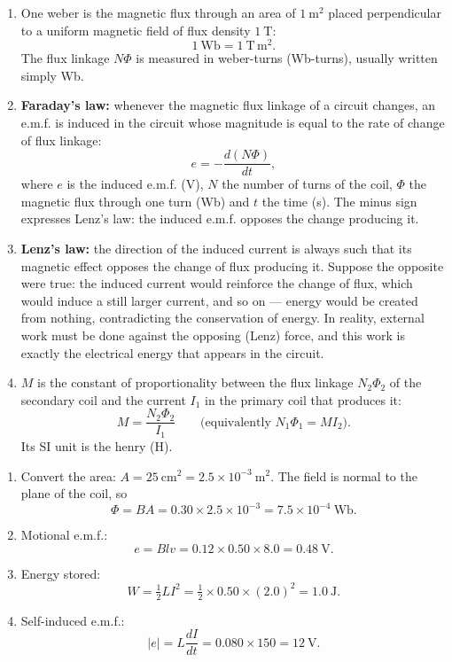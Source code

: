 \documentclass[11pt]{article}
\begin{document}
\begin{corrige}
\begin{enumerate}
\item One weber is the magnetic flux through an area of $1\ \mathrm{m^2}$ placed perpendicular to a uniform magnetic field of flux density $1\ \mathrm{T}$:
\[ 1\ \mathrm{Wb} = 1\ \mathrm{T\,m^2}. \]
The flux linkage $N\Phi$ is measured in weber-turns (Wb-turns), usually written simply Wb.
\item \textbf{Faraday's law:} whenever the magnetic flux linkage of a circuit changes, an e.m.f. is induced in the circuit whose magnitude is equal to the rate of change of flux linkage:
\[ e = -\frac{d(N\Phi)}{dt}, \]
where $e$ is the induced e.m.f. (V), $N$ the number of turns of the coil, $\Phi$ the magnetic flux through one turn (Wb) and $t$ the time (s). The minus sign expresses Lenz's law: the induced e.m.f. opposes the change producing it.
\item \textbf{Lenz's law:} the direction of the induced current is always such that its magnetic effect opposes the change of flux producing it. Suppose the opposite were true: the induced current would reinforce the change of flux, which would induce a still larger current, and so on --- energy would be created from nothing, contradicting the conservation of energy. In reality, external work must be done against the opposing (Lenz) force, and this work is exactly the electrical energy that appears in the circuit.
\item $M$ is the constant of proportionality between the flux linkage $N_2\Phi_2$ of the secondary coil and the current $I_1$ in the primary coil that produces it:
\[ M = \frac{N_2\Phi_2}{I_1} \qquad \text{(equivalently } N_1\Phi_1 = MI_2\text{)}. \]
Its SI unit is the henry (H).
\end{enumerate}
\end{corrige}

\begin{corrige}
\begin{enumerate}
\item Convert the area: $A = 25\ \mathrm{cm^2} = 2.5\times10^{-3}\ \mathrm{m^2}$. The field is normal to the plane of the coil, so
\[ \Phi = BA = 0.30 \times 2.5\times10^{-3} = 7.5\times10^{-4}\ \mathrm{Wb}. \]
\item Motional e.m.f.:
\[ e = Blv = 0.12 \times 0.50 \times 8.0 = 0.48\ \mathrm{V}. \]
\item Energy stored:
\[ W = \tfrac{1}{2}LI^2 = \tfrac{1}{2}\times 0.50 \times (2.0)^2 = 1.0\ \mathrm{J}. \]
\item Self-induced e.m.f.:
\[ |e| = L\frac{dI}{dt} = 0.080 \times 150 = 12\ \mathrm{V}. \]
\end{enumerate}
\end{corrige}
\end{document}
